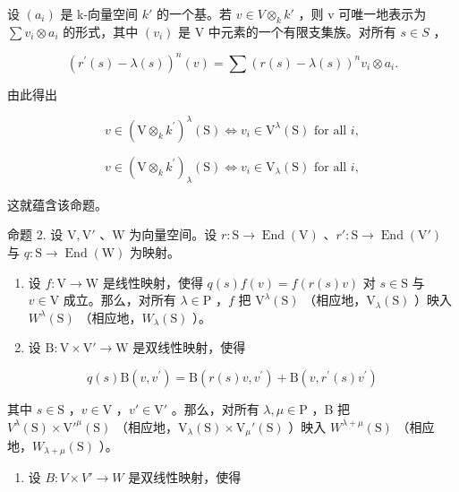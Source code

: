 设 \((a_{i})\) 是 k-向量空间 \(k'\) 的一个基。若 \(v \in V \otimes_{k} k'\) ，则 v 可唯一地表示为 \(\sum v_{i} \otimes a_{i}\) 的形式，其中 \((v_{i})\) 是 V 中元素的一个有限支集族。对所有 \(s \in S\) ，

\[
(r ^ {\prime} (s) - \lambda (s)) ^ {n} (v) = \sum (r (s) - \lambda (s)) ^ {n} v _ {i} \otimes a _ {i}.
\]

由此得出

\[
v \in (\mathrm{V} \otimes_ {k} k ^ {\prime}) ^ {\lambda} (\mathrm{S}) \Longleftrightarrow v _ {i} \in \mathrm{V} ^ {\lambda} (\mathrm{S}) \text { for   all } i,
\]

\[
v \in (\mathrm{V} \otimes_ {k} k ^ {\prime}) _ {\lambda} (\mathrm{S}) \Longleftrightarrow v _ {i} \in \mathrm{V} _ {\lambda} (\mathrm{S}) \text { for   all } i,
\]

这就蕴含该命题。

命题 2. 设 \(\mathrm{V}, \mathrm{V}'\) 、\(\mathrm{W}\) 为向量空间。设 \(r: \mathrm{S} \to \operatorname{End}(\mathrm{V})\) 、\(r': \mathrm{S} \to \operatorname{End}(\mathrm{V}')\) 与 \(q: \mathrm{S} \to \operatorname{End}(\mathrm{W})\) 为映射。

\begin{enumerate}
\def\labelenumi{(\roman{enumi})}
\item
  设 \(f: \mathrm{V} \to \mathrm{W}\) 是线性映射，使得 \(q(s)f(v) = f(r(s)v)\) 对 \(s \in \mathrm{S}\) 与 \(v \in \mathrm{V}\) 成立。那么，对所有 \(\lambda \in \mathrm{P}\) ，\(f\) 把 \(\mathrm{V}^{\lambda}(\mathrm{S})\) （相应地，\(\mathrm{V}_{\lambda}(\mathrm{S})\) ）映入 \(W^{\lambda}(\mathrm{S})\) （相应地，\(W_{\lambda}(\mathrm{S})\) ）。
\item
  设 \(\mathrm{B}:\mathrm{V}\times \mathrm{V}'\to \mathrm{W}\) 是双线性映射，使得
\end{enumerate}

\[
q (s) \mathrm{B} (v, v ^ {\prime}) = \mathrm{B} (r (s) v, v ^ {\prime}) + \mathrm{B} (v, r ^ {\prime} (s) v ^ {\prime})
\]

其中 \(s \in \mathrm{S}\) ，\(v \in \mathrm{V}\) ，\(v' \in \mathrm{V}'\) 。那么，对所有 \(\lambda, \mu \in \mathrm{P}\) ，B 把 \(V^{\lambda}(\mathrm{S}) \times \mathrm{V}'^{\mu}(\mathrm{S})\) （相应地，\(\mathrm{V}_{\lambda}(\mathrm{S}) \times \mathrm{V}_{\mu}'(\mathrm{S})\) ）映入 \(W^{\lambda + \mu}(\mathrm{S})\) （相应地，\(W_{\lambda + \mu}(\mathrm{S})\) ）。

\begin{enumerate}
\def\labelenumi{(\roman{enumi})}
\setcounter{enumi}{2}
\tightlist
\item
  设 \(B: V \times V' \to W\) 是双线性映射，使得
\end{enumerate}

